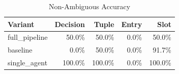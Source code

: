 \begin{table}[htbp]
\centering
\caption{Non-Ambiguous Accuracy}
\label{tab:acc-non-ambig}
\begin{tabular}{l rrrr}
\toprule
Variant & Decision & Tuple & Entry & Slot \\
\midrule
  full\_pipeline & 50.0\% & 50.0\% & 0.0\% & 50.0\% \\
  baseline & 0.0\% & 50.0\% & 0.0\% & 91.7\% \\
  single\_agent & 100.0\% & 100.0\% & 0.0\% & 100.0\% \\
\bottomrule
\end{tabular}
\end{table}
